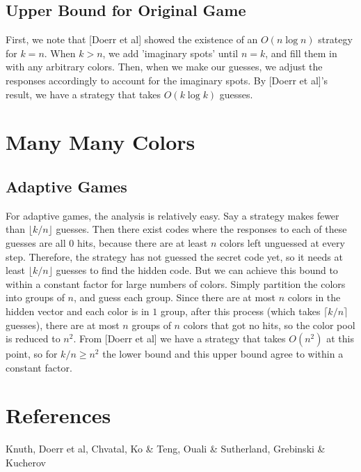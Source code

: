 \documentclass[12pt, a4paper]{article}
\begin{document}
\subsection{Upper Bound for Original Game}
First, we note that [Doerr et al] showed the existence of an $O(n \log n)$ strategy for
$k = n$. When $k>n$, we add 'imaginary spots' until $n = k$, and fill them in with any
arbitrary colors. Then, when we make our guesses, we adjust the responses accordingly
to account for the imaginary spots. By [Doerr et al]'s result, we have a strategy that
takes $O(k \log k)$ guesses. 

\section{Many Many Colors}
\subsection{Adaptive Games}
For adaptive games, the analysis is relatively easy. Say a strategy makes fewer than $\lfloor k/n \rfloor$
guesses. Then there exist codes where the responses to each of these guesses are all 0 hits, 
because there are at least $n$ colors left unguessed at every step. Therefore, the strategy 
has not guessed the secret code yet, so it needs at least $\lfloor k/n \rfloor$ guesses to find the
hidden code. But we can achieve this bound to within a constant factor for large numbers of colors.
Simply partition the colors into groups of $n$, and guess each group. Since there are at most $n$ colors
in the hidden vector and each color is in $1$ group, after this process (which takes $\lceil k/n \rceil$
guesses), there are at most $n$ groups of $n$ colors that got no hits, so the color pool is reduced to
$n^2$. From [Doerr et al] we have a strategy that takes $O(n^2)$ at this point, so for $k/n \geq n^2$
the lower bound and this upper bound agree to within a constant factor.

\clearpage
\section*{References}
Knuth, Doerr et al, Chvatal, Ko \& Teng, Ouali \& Sutherland, Grebinski \& Kucherov
\end{document}

